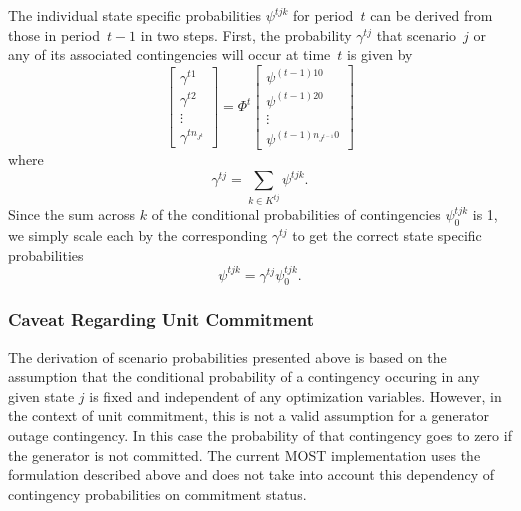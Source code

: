 \documentclass[12pt]{article}
\newcommand{\most}[0]{{MOST}}
\numberwithin{equation}{section}
\numberwithin{table}{section}
\numberwithin{figure}{section}
\begin{document}
The individual state specific probabilities $\psi^{tjk}$ for period~$t$ can be derived from those in period~$t-1$ in two steps. First, the probability $\gamma^{tj}$ that scenario~$j$ or any of its associated contingencies will occur at time~$t$ is given by
\begin{equation}
   \left[\begin{array}{c}  \gamma^{t1}\\  \gamma^{t2} \\ \vdots \\  \gamma^{tn_{J^t}}
        \end{array} \right]
   =
   \Phi^t
   \left[\begin{array}{c} \psi^{(t-1)10} \\ \psi^{(t-1)20} \\ \vdots \\ \psi^{(t-1)n_{J^{t-1}}0}
       \end{array} \right]
\end{equation}
where
\begin{equation}
\gamma^{tj} = \sum_{k \in K^{tj}} \psi^{tjk}.
\end{equation}
Since the sum across $k$ of the conditional probabilities of contingencies $\psi_0^{tjk}$ is 1, we simply scale each by the corresponding $\gamma^{tj}$ to get the correct state specific probabilities
\begin{equation}
\psi^{tjk} = \gamma^{tj} \psi_0^{tjk}.
\end{equation}

\subsubsection*{Caveat Regarding Unit Commitment}

The derivation of scenario probabilities presented above is based on the assumption that the conditional probability of a contingency occuring in any given state $j$ is fixed and independent of any optimization variables. However, in the context of unit commitment, this is not a valid assumption for a generator outage contingency. In this case the probability of that contingency goes to zero if the generator is not committed. The current \most{} implementation uses the formulation described above and does not take into account this dependency of contingency probabilities on commitment status.
\end{document}
